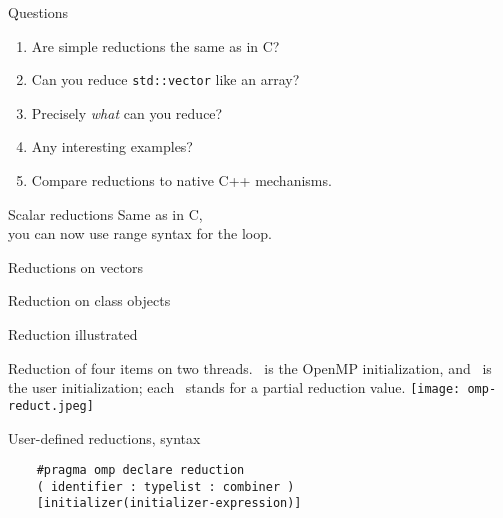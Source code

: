 
\begin{numberedframe}{Questions}
  \begin{enumerate}
  \item Are simple reductions the same as in C?
  \item Can you reduce \lstinline{std::vector} like an array?
  \item Precisely \emph{what} can you reduce?
  \item Any interesting examples?
  \item Compare reductions to native C++ mechanisms.
  \end{enumerate}
\end{numberedframe}

\begin{numberedframe}{Scalar reductions}
  Same as in C,\\
  you can now use range syntax for the loop.
\end{numberedframe}

\begin{numberedframe}{Reductions on vectors}
  
\end{numberedframe}

\begin{numberedframe}{Reduction on class objects}
  
\end{numberedframe}

\begin{numberedframe}{Reduction illustrated}
  \label{fig:omp-reduct}

  Reduction of four items on two threads.
  ~is the OpenMP initialization, and ~is the
  user initialization; each ~stands for a partial reduction value.
  \texttt{[image: omp-reduct.jpeg]}
\end{numberedframe}

\begin{numberedframe}{User-defined reductions, syntax}
  \begin{lstlisting}
    #pragma omp declare reduction 
    ( identifier : typelist : combiner )
    [initializer(initializer-expression)]
  \end{lstlisting}
\end{numberedframe}

